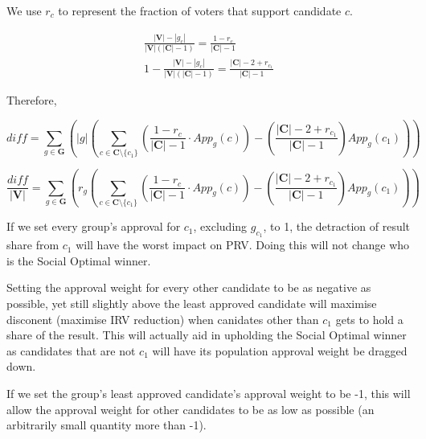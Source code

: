 \documentclass{article}
\begin{document}
We use $r_c$ to represent the fraction of voters that support candidate $c$.

\begin{gather} 
\frac{|\boldsymbol{V}|-|g_c|}{|\boldsymbol{V}|(|\boldsymbol{C}|-1)} = \frac{1-r_c}{|\boldsymbol{C}|-1} \\
1-\frac{|\boldsymbol{V}|-|g_c|}{|\boldsymbol{V}|(|\boldsymbol{C}|-1)} = \frac{|\boldsymbol{C}|-2+r_{c_1}}{|\boldsymbol{C}|-1}
\end{gather}

Therefore,

\begin{equation}
diff = \sum^{}_{g \in \boldsymbol{G}}{\left(|g| \left( \sum^{}_{c \in \boldsymbol{C} \setminus \{c_1\}}{\left(\frac{1-r_c}{|\boldsymbol{C}|-1} \cdot App_g(c)\right)} - \left(\frac{|\boldsymbol{C}|-2+r_{c_1}}{|\boldsymbol{C}|-1}\right)App_g(c_1) \right) \right)}
\end{equation}

\begin{equation}
\frac{diff}{|\boldsymbol{V}|} = \sum^{}_{g \in \boldsymbol{G}}{\left(r_g \left( \sum^{}_{c \in \boldsymbol{C} \setminus \{c_1\}}{\left(\frac{1-r_c}{|\boldsymbol{C}|-1} \cdot App_g(c)\right)} - \left(\frac{|\boldsymbol{C}|-2+r_{c_1}}{|\boldsymbol{C}|-1}\right)App_g(c_1) \right) \right)}
\end{equation}

If we set every group's approval for $c_1$, excluding $g_{c_1}$, to 1, the detraction of result share from $c_1$ will have the worst impact on PRV. Doing this will not change who is the Social Optimal winner.

Setting the approval weight for every other candidate to be as negative as possible, yet still slightly above the least approved candidate will maximise disconent (maximise IRV reduction) when canidates other than $c_1$ gets to hold a share of the result. This will actually aid in upholding the Social Optimal winner as candidates that are not $c_1$ will have its population approval weight be dragged down.

If we set the group's least approved candidate's approval weight to be -1, this will allow the approval weight for other candidates to be as low as possible (an arbitrarily small quantity more than -1).
\end{document}
